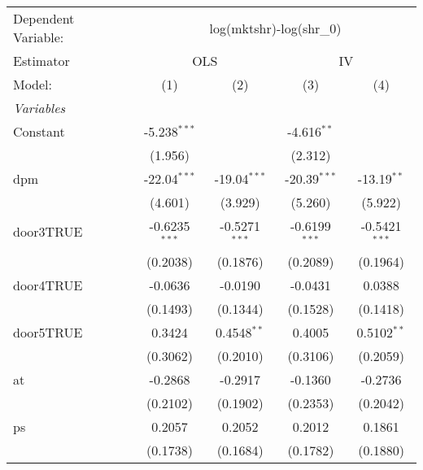 
\begingroup
\centering
\begin{tabular}{lcccc}
   \tabularnewline \midrule \midrule
   Dependent Variable: & \multicolumn{4}{c}{log(mktshr)-log(shr\_0)}\\
   Estimator & \multicolumn{2}{c}{OLS} & \multicolumn{2}{c}{IV} \\ 
   Model:                       & (1)             & (2)             & (3)                    & (4)\\  
   \midrule
   \emph{Variables}\\
   Constant                     & -5.238$^{***}$  &                 & -4.616$^{**}$          &   \\   
                                & (1.956)         &                 & (2.312)                &   \\   
   dpm                          & -22.04$^{***}$  & -19.04$^{***}$  & -20.39$^{***}$         & -13.19$^{**}$\\   
                                & (4.601)         & (3.929)         & (5.260)                & (5.922)\\   
   door3TRUE                    & -0.6235$^{***}$ & -0.5271$^{***}$ & -0.6199$^{***}$        & -0.5421$^{***}$\\   
                                & (0.2038)        & (0.1876)        & (0.2089)               & (0.1964)\\   
   door4TRUE                    & -0.0636         & -0.0190         & -0.0431                & 0.0388\\   
                                & (0.1493)        & (0.1344)        & (0.1528)               & (0.1418)\\   
   door5TRUE                    & 0.3424          & 0.4548$^{**}$   & 0.4005                 & 0.5102$^{**}$\\   
                                & (0.3062)        & (0.2010)        & (0.3106)               & (0.2059)\\   
   at                           & -0.2868         & -0.2917         & -0.1360                & -0.2736\\   
                                & (0.2102)        & (0.1902)        & (0.2353)               & (0.2042)\\   
   ps                           & 0.2057          & 0.2052          & 0.2012                 & 0.1861\\   
                                & (0.1738)        & (0.1684)        & (0.1782)               & (0.1880)\\   

\end{tabular}
